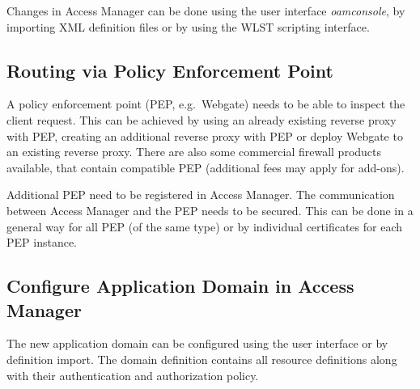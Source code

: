 \documentclass[11pt]{report}
\begin{document}
Changes in Access Manager can be done using the user interface
\emph{oamconsole}, by importing XML definition files or by using the WLST
scripting interface.


\subsection{Routing via Policy Enforcement Point}

A policy enforcement point (PEP, e.g.\ Webgate) needs to be able to inspect the
client request.  This can be achieved by using an already existing reverse proxy
with PEP, creating an additional reverse proxy with PEP or deploy Webgate to an
existing reverse proxy.  There are also some commercial firewall products
available, that contain compatible PEP (additional fees may apply for add-ons).\@

Additional PEP need to be registered in Access Manager.  The communication
between Access Manager and the PEP needs to be secured.  This can be done in a
general way for all PEP (of the same type) or by individual certificates for
each PEP instance.


\subsection{Configure Application Domain in Access Manager}

The new application domain can be configured using the user interface or by
definition import.  The domain definition contains all resource definitions 
along with their authentication and authorization policy. 
\end{document}
